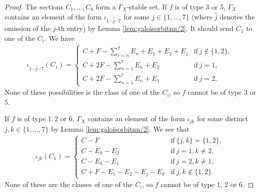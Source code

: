 \documentclass[10pt,a4paper]{amsart}
\begin{document}
\begin{proof}
    The sections $C_1, \ldots, C_8$ form a $\Gamma_X$-stable set. If $f$ is of type 3 or 5, $\Gamma_X$ contains an element of the form $\iota_{1\cdots \hat{j} \cdots 7}$ for some $j \in \{1, \ldots, 7\}$ (where $\hat{j}$ denotes the omission of the $j$-th entry) by Lemma \ref{lem:galoisorbitnn/2}. It should send $C_1$ to one of the $C_i$. We have
\begin{align*}
    \iota_{1\cdots \hat{j} \cdots 7}(C_1) = \begin{cases}
        C + F - \sum_{i=n}^7 E_n + E_1 + E_2 + E_j &\text{if} \ j \notin \{1, 2\},\\
        C + 2F - \sum_{n=1}^7 E_n + E_2 &\text{if} \ j = 1,\\
        C + 2F - \sum_{n=1}^7 E_n + E_1 &\text{if} \ j = 2.
    \end{cases}
\end{align*}
None of these possibilities is the class of one of the $C_i$, so $f$ cannot be of type 3 or 5.

If $f$ is of type $1, 2$ or $6$, $\Gamma_X$ contains an element of the form $\iota_{jk}$ for some distinct $j, k \in \{1, \ldots, 7\}$ by Lemma \ref{lem:galoisorbitnn/2}. We see that
\begin{align*}
    \iota_{jk}(C_1) = \begin{cases}
        C-F &\text{if} \ \{j, k\} = \{1, 2\},\\
        C - E_k - E_2 &\text{if} \ j = 1, k \neq 2,\\
        C - E_k - E_1 &\text{if} \ j = 2, k \neq 1,\\
        C + F - E_1 - E_2 - E_j - E_k &\text{if} \ j, k \notin \{1, 2\}.
    \end{cases}
\end{align*}
None of these are the classes of one of the $C_i$, so $f$ cannot be of type 1, 2 or 6.
\end{proof} 
\end{document}
